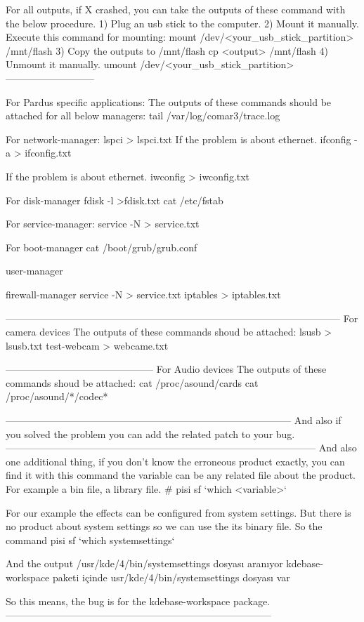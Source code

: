 \documentclass[a4paper,10pt]{article}
\begin{document}
For all outputs, if X crashed, you can take the outputs of these command with the below procedure.
1) Plug an usb stick to the computer.
2) Mount it manually.
    Execute this command for mounting:
    mount /dev/<your_usb_stick_partition> /mnt/flash
3) Copy the outputs to /mnt/flash
     cp <output> /mnt/flash
4) Unmount it manually.
  umount /dev/<your_usb_stick_partition>
---------------------------

For Pardus specific applications:
The outputs of these commands should be attached for all below managers:
 tail /var/log/comar3/trace.log

 For network-manager:
  lspci > lspci.txt
  If the problem is about ethernet.
    ifconfig -a > ifconfig.txt

  If the problem is about ethernet.
    iwconfig > iwconfig.txt
  
  For disk-manager
    fdisk -l >fdisk.txt
    cat /etc/fstab

  For service-manager:
   service -N > service.txt

  For boot-manager
  cat /boot/grub/grub.conf
  
  user-manager

  firewall-manager
    service -N > service.txt
    iptables > iptables.txt

------------------------------------------------------------------------------------------------------
For camera devices
The outputs of these commands shoud be attached:
  lsusb > lsusb.txt
  test-webcam > webcame.txt

---------------------------------------------
For Audio devices
The outputs of these commands shoud be attached:
  cat /proc/asound/cards
  cat /proc/asound/*/codec*

---------------------------------------------------------------------------------------
And also if you solved the problem you can add the related patch to your bug.
-----------------------------------------------------------------------------------------------
And also one additional thing, if you don't know the erroneous product exactly, you can find it with this command
the variable can be any related file about the product. For example a bin file, a library file. 
# pisi sf `which <variable>`

For our example the effects can be configured from system settings. But there is no product about system settings so we can use the its binary file.
So the command 
pisi sf `which systemsettings`

And the output
/usr/kde/4/bin/systemsettings dosyası aranıyor
kdebase-workspace paketi içinde usr/kde/4/bin/systemsettings dosyası var

So this means, the bug is for the kdebase-workspace package.
---------------------------------------------------------------------------------
\end{document}
